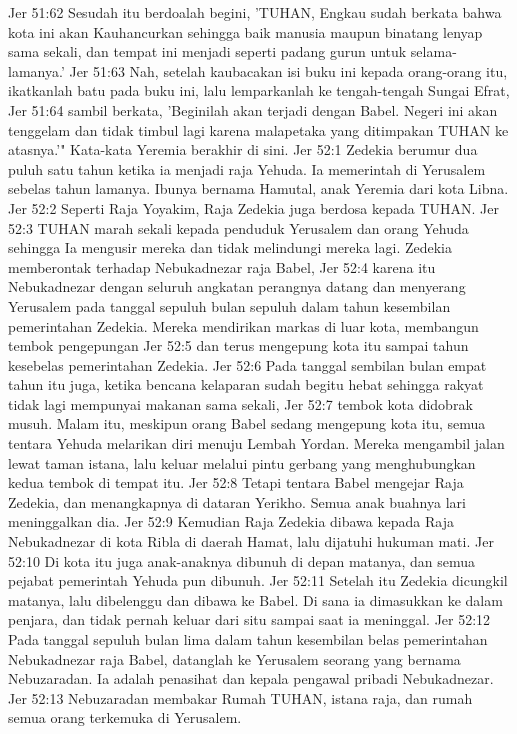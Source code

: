 Jer 51:62  Sesudah itu berdoalah begini, 'TUHAN, Engkau sudah berkata bahwa kota ini akan Kauhancurkan sehingga baik manusia maupun binatang lenyap sama sekali, dan tempat ini menjadi seperti padang gurun untuk selama-lamanya.'
Jer 51:63  Nah, setelah kaubacakan isi buku ini kepada orang-orang itu, ikatkanlah batu pada buku ini, lalu lemparkanlah ke tengah-tengah Sungai Efrat,
Jer 51:64  sambil berkata, 'Beginilah akan terjadi dengan Babel. Negeri ini akan tenggelam dan tidak timbul lagi karena malapetaka yang ditimpakan TUHAN ke atasnya.'" Kata-kata Yeremia berakhir di sini.
Jer 52:1  Zedekia berumur dua puluh satu tahun ketika ia menjadi raja Yehuda. Ia memerintah di Yerusalem sebelas tahun lamanya. Ibunya bernama Hamutal, anak Yeremia dari kota Libna.
Jer 52:2  Seperti Raja Yoyakim, Raja Zedekia juga berdosa kepada TUHAN.
Jer 52:3  TUHAN marah sekali kepada penduduk Yerusalem dan orang Yehuda sehingga Ia mengusir mereka dan tidak melindungi mereka lagi. Zedekia memberontak terhadap Nebukadnezar raja Babel,
Jer 52:4  karena itu Nebukadnezar dengan seluruh angkatan perangnya datang dan menyerang Yerusalem pada tanggal sepuluh bulan sepuluh dalam tahun kesembilan pemerintahan Zedekia. Mereka mendirikan markas di luar kota, membangun tembok pengepungan
Jer 52:5  dan terus mengepung kota itu sampai tahun kesebelas pemerintahan Zedekia.
Jer 52:6  Pada tanggal sembilan bulan empat tahun itu juga, ketika bencana kelaparan sudah begitu hebat sehingga rakyat tidak lagi mempunyai makanan sama sekali,
Jer 52:7  tembok kota didobrak musuh. Malam itu, meskipun orang Babel sedang mengepung kota itu, semua tentara Yehuda melarikan diri menuju Lembah Yordan. Mereka mengambil jalan lewat taman istana, lalu keluar melalui pintu gerbang yang menghubungkan kedua tembok di tempat itu.
Jer 52:8  Tetapi tentara Babel mengejar Raja Zedekia, dan menangkapnya di dataran Yerikho. Semua anak buahnya lari meninggalkan dia.
Jer 52:9  Kemudian Raja Zedekia dibawa kepada Raja Nebukadnezar di kota Ribla di daerah Hamat, lalu dijatuhi hukuman mati.
Jer 52:10  Di kota itu juga anak-anaknya dibunuh di depan matanya, dan semua pejabat pemerintah Yehuda pun dibunuh.
Jer 52:11  Setelah itu Zedekia dicungkil matanya, lalu dibelenggu dan dibawa ke Babel. Di sana ia dimasukkan ke dalam penjara, dan tidak pernah keluar dari situ sampai saat ia meninggal.
Jer 52:12  Pada tanggal sepuluh bulan lima dalam tahun kesembilan belas pemerintahan Nebukadnezar raja Babel, datanglah ke Yerusalem seorang yang bernama Nebuzaradan. Ia adalah penasihat dan kepala pengawal pribadi Nebukadnezar.
Jer 52:13  Nebuzaradan membakar Rumah TUHAN, istana raja, dan rumah semua orang terkemuka di Yerusalem.
